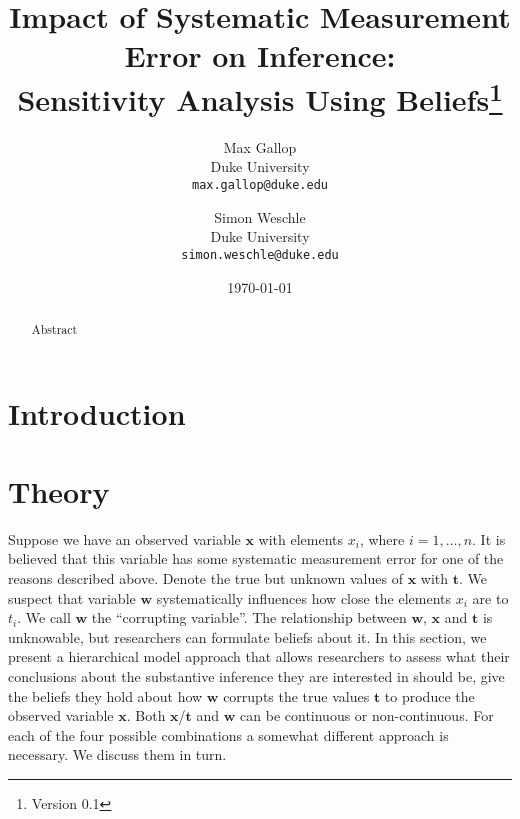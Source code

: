\documentclass[fignum,letterpaper,12pt]{article}
\title{Impact of Systematic Measurement Error on Inference: \\ Sensitivity Analysis Using Beliefs\thanks{Version 0.1}}
\author{
Max Gallop \\
	Duke University\\
	\texttt{max.gallop@duke.edu}
\and
Simon Weschle \\
	Duke University\\
	\texttt{simon.weschle@duke.edu}\\ %
}
\date{\small{\today}}
\begin{document}

\maketitle
\thispagestyle{empty}

\begin{abstract}
\noindent
Abstract
\end{abstract}
\doublespacing
\clearpage



\newpage
\setcounter{page}{1}
\section{Introduction} \label{sec:introduction}

%

\section{Theory} \label{sec:theory}

Suppose we have an observed variable $\mathbf{x}$ with elements $x_i$, where $i=1, \dots, n$. It is believed that this variable has some systematic measurement error for one of the reasons described above. Denote the true but unknown values of $\mathbf{x}$ with $\mathbf{t}$. We suspect that variable $\mathbf{w}$ systematically influences how close the elements $x_i$ are to $t_i$. We call $\mathbf{w}$ the ``corrupting variable''. The relationship between $\mathbf{w}$, $\mathbf{x}$ and $\mathbf{t}$ is unknowable, but researchers can formulate beliefs about it. In this section, we present a hierarchical model approach that allows researchers to assess what their conclusions about the substantive inference they are interested in should be, give the beliefs they hold about how $\mathbf{w}$ corrupts the true values $\mathbf{t}$ to produce the observed variable $\mathbf{x}$. Both $\mathbf{x}$/$\mathbf{t}$ and $\mathbf{w}$ can be continuous or non-continuous. For each of the four possible combinations a somewhat different approach is necessary. We discuss them in turn.
\end{document}
